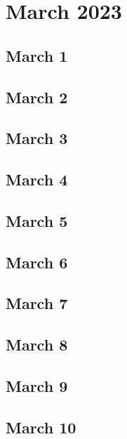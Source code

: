 %
%
%

\chapter{March 2023}
\label{intro} %

\section{March 1}

\section{March 2}

\section{March 3}

\section{March 4}

\section{March 5}

\section{March 6}

\section{March 7}

\section{March 8}

\section{March 9}

\section{March 10}


